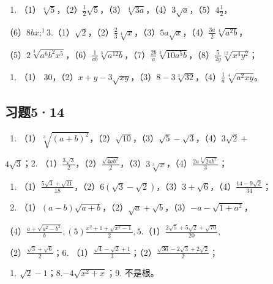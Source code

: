 \begin{enumerate}
\item
  （1）\(\sqrt[4]{5}\)，（2）\(\frac{1}{2}\sqrt{5}\)，（3）\(\sqrt[4]{3a}\)，（4）\(3\sqrt{a}\)，（5）\(4\frac{1}{2}\)，
\end{enumerate}

（6）\(8bx;^{1}3.\)（1）\(\sqrt{2}\)，（2）\(\frac{2}{3}\sqrt[4]{x}\)，（3）\(5a\sqrt{x}\)，（4）\(\frac{3a}{2}\sqrt[4]{a^2b}\)，

（5）\(2\sqrt[3]{a^6b^2x^5}\)，（6）\(\frac{1}{ab}\sqrt[3]{a^{12}b}\)，（7）\(\frac{2b}{a}\sqrt[3]{10a^{5}b}\)，（8）\(\frac{5}{2y}\sqrt[12]{x^4y^2}\)；

\begin{enumerate}[start=4]
\item
  （1）
  30，（2）\(x + y - 3\sqrt{xy}\)，（3）\(8 - 3\sqrt[3]{32}\)，（4）\(\frac{1}{a}\sqrt[4]{a^2xy}\)。
\end{enumerate}

\subsection{习题5·14}

\begin{enumerate}
\item
  （1）\(\sqrt[3]{(a + b)^2}\)，（2）\(\sqrt{10}\)，（3）\(\sqrt{5} - \sqrt{3}\)，（4）\(3\sqrt{2} +\)
\end{enumerate}

\(4\sqrt{3}\)；2.
（1）\(\frac{3\sqrt{3}}{2}\)，（2）\(\frac{\sqrt{4ab^{2}}}{2}\)，（3）\(3\sqrt[3]{x}\)，（4）\(\frac{2a\sqrt[3]{2ab^{2}}}{3}\)；

\begin{enumerate}[start=3]
\item
  （1）\(\frac{5\sqrt{3} + \sqrt{21}}{18}\)，（2）\(6(\sqrt{3} - \sqrt{2})\)，（3）\(3 + \sqrt{6}\)，（4）\(\frac{14 - 9\sqrt{2}}{34}\)；
\item
  （1）\((a - b)\sqrt{a + b}\)，（2）\(\sqrt{a} + \sqrt{b}\)，（3）\(-a - \sqrt{1 + a^2}\)，
\end{enumerate}

（4）\(\frac{a + \sqrt{a^2 - b^2}}{b}, (5) \frac{x^2 + 1 + \sqrt{x^2 - 1}}{2}, 5.\)（1）\(\frac{2\sqrt{5} + 5\sqrt{2} + \sqrt{70}}{20},\)

（2）\(\frac{\sqrt{3} + \sqrt{6}}{2}\)；6.
（1）\(\frac{\sqrt{4} - \sqrt{2} + 1}{3}\)；（2）\(\frac{\sqrt{36} - 2\sqrt{3} + 2\sqrt{2}}{2}\)；

\begin{enumerate}[start=7]
\item
  \(\sqrt{2} - 1\)；8.\(-4\sqrt{x^2 + x}\)；9. 不是根。
\end{enumerate}

